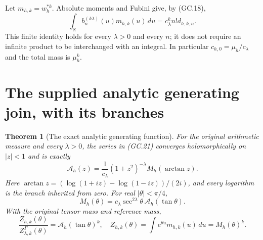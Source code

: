 \documentclass[11pt]{article}
\newtheorem{theorem}{Theorem}[section]
\begin{document}
Let $m_{h,k}=w_h^{*k}$. Absolute moments and Fubini give, by (GC.18),
\[
 \int_{\mathbb R}b_n^{(k\lambda)}(u)m_{h,k}(u)\,du
       =c_\lambda^k n!d_{h,k,n}.                              \tag{GC.23}
\]
This finite identity holds for every $\lambda>0$ and every $n$;
it does not require an infinite product to be interchanged with an
integral. In particular $c_{h,0}=\mu_h/c_\lambda$ and the total
mass is $\mu_h^k$.

\section{The supplied analytic generating join, with its branches}

\begin{theorem}[The exact analytic generating function]
For the original arithmetic measure and every $\lambda>0$, the series
in (GC.21) converges holomorphically on $|z|<1$ and is exactly
\[
 \boxed{\mathcal A_h(z)=\frac1{c_\lambda}
            (1+z^2)^{-\lambda}M_h(\arctan z).}                 \tag{GC.24}
\]
Here
$\arctan z=(\log(1+iz)-\log(1-iz))/(2i)$, and every logarithm
is the branch inherited from zero. For real $|\theta|<\pi/4$,
\[
 \boxed{M_h(\theta)=c_\lambda\sec^{2\lambda}\theta\,
                        \mathcal A_h(\tan\theta).}             \tag{GC.25}
\]
With the original tensor mass and reference mass,
\[
 \boxed{\frac{Z_{h,k}(\theta)}{Z_{\lambda,k}^\Gamma(\theta)}
       =\mathcal A_h(\tan\theta)^k,\quad
 Z_{h,k}(\theta)=\int e^{\theta u}m_{h,k}(u)\,du=M_h(\theta)^k.}
                                                               \tag{GC.26}
\]
\end{theorem}
\end{document}
